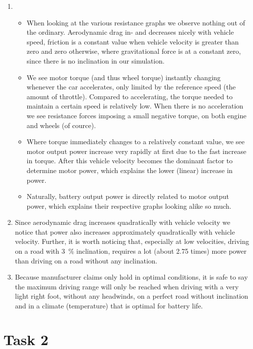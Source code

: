 \documentclass[11pt,titlepage]{report}
\begin{document}
\begin{enumerate}
\item
	\begin{itemize}
		\item
		When looking at the various resistance graphs we observe nothing out of the ordinary. Aerodynamic drag in- and decreases nicely with vehicle speed, friction is a constant value when vehicle velocity is greater than zero and zero otherwise, where gravitational force is at a constant zero, since there is no inclination in our simulation.
		\item
		We see motor torque (and thus wheel torque) instantly changing whenever the car accelerates, only limited by the reference speed (the amount of throttle). Compared to accelerating, the torque needed to maintain a certain speed is relatively low. When there is no acceleration we see resistance forces imposing a small negative torque, on both engine and wheels (of cource).
		\item
		Where torque immediately changes to a relatively constant value, we see motor output power increase very rapidly at first due to the fast increase in torque. After this vehicle velocity becomes the dominant factor to determine motor power, which explains the lower (linear) increase in power.
		\item
		Naturally, battery output power is directly related to motor output power, which explains their respective graphs looking alike so much.
	\end{itemize}

\item
	Since aerodynamic drag increases quadratically with vehicle velocity we notice that power also increases approximately quadratically with vehicle velocity. Further, it is worth noticing that, especially at low velocities, driving on a road with \SI{3}{\percent} inclination, requires a lot (about \num{2.75} times) more power than driving on a road without any inclination.

\item
	Because manufacturer claims only hold in optimal conditions, it is safe to say the maximum driving range will only be reached when driving with a very light right foot, without any headwinds, on a perfect road without inclination and in a climate (temperature) that is optimal for battery life.
\end{enumerate}

\section{Task 2}
\end{document}
